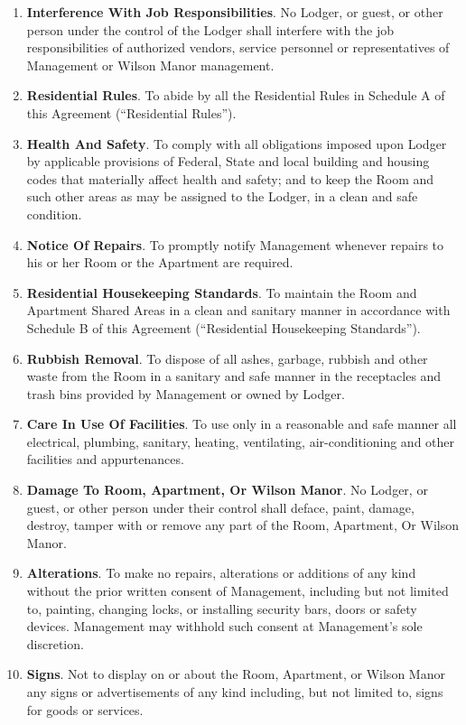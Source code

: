 \documentclass[12pt,letterpaper]{article}
\newcommand{\lodger}{Lodger}
\newcommand{\rules}{Residential Rules}
\newcommand{\standards}{Residential Housekeeping Standards}
\newcommand{\management}{Management}
\newcommand{\condo}{Wilson Manor}
\newcommand{\apt}{Apartment}
\newcommand{\room}{Room}
\newcommand{\shared}{Apartment Shared Areas}
\begin{document}
\begin{enumerate}
\begin{enumerate}
			\item \textbf{Interference With Job Responsibilities}. No \lodger{}, or guest, or other person under the control of the \lodger{} shall interfere with the job responsibilities of authorized vendors, service personnel or representatives of \management{} or \condo{} management. 
			\item \textbf{\rules{}}. To abide by all the \rules{} in Schedule A of this Agreement (``\rules{}'').
			\item \textbf{Health And Safety}. To comply with all obligations imposed upon \lodger{} by applicable provisions of Federal, State and local building and housing codes that materially affect health and safety; and to keep the \room{} and such other areas as may be assigned to the \lodger{}, in a clean and safe condition. 
			\item \textbf{Notice Of Repairs}. To promptly notify \management{} whenever repairs to his or her \room{} or the \apt{} are required. 
			\item \textbf{\standards{}}. To maintain the \room{} and \shared{} in a clean and sanitary manner in accordance with Schedule B of this Agreement (``\standards{}'').
			\item \textbf{Rubbish Removal}. To dispose of all ashes, garbage, rubbish and other waste from the \room{} in a sanitary and safe manner in the receptacles and trash bins provided by \management{} or owned by \lodger{}. 
			\item \textbf{Care In Use Of Facilities}. To use only in a reasonable and safe manner all electrical, plumbing, sanitary, heating, ventilating, air-conditioning and other facilities and appurtenances. 
			\item \textbf{Damage To \room{}, \apt{}, Or \condo{}}. No \lodger{}, or guest, or other person under their control shall deface, paint, damage, destroy, tamper with or remove any part of the \room{}, \apt{}, Or \condo{}.
			\item \textbf{Alterations}. To make no repairs, alterations or additions of any kind without the prior written consent of \management{}, including but not limited to, painting, changing locks, or installing security bars, doors or safety devices. \management{} may withhold such consent at \management{}'s sole discretion. 
			\item \textbf{Signs}. Not to display on or about the \room{}, \apt{}, or \condo{} any signs or advertisements of any kind including, but not limited to, signs for goods or services. 
		\end{enumerate}

\end{enumerate}
\end{document}
